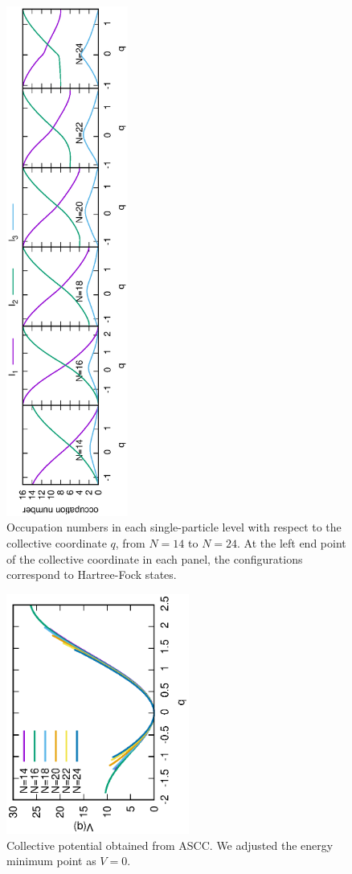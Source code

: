 \documentclass[%
superscriptaddress,
showpacs,
nofootinbib,
amsmath,amssymb,
aps,
prc,
twocolumn,
floatfix ]%
{revtex4-1}
\begin{document}
\begin{figure}[t]
 \begin{center}
  \includegraphics[width=40mm,angle=-90]{occ_number.eps}
 \end{center}
	\caption{Occupation numbers in each single-particle level with respect to the collective coordinate $q$, from $N=14$ to $N=24$. At the left end point of the collective coordinate in each panel, the configurations correspond to Hartree-Fock states.
}
 \label{occ_number}
\end{figure}
\begin{figure}[htbp]
 \begin{center}
  \includegraphics[width=60mm,angle=-90]{potential.eps}
 \end{center}
	\caption{Collective potential obtained from ASCC. We adjusted the energy minimum point as $V=0$.
}
 \label{potential}
\end{figure}
\end{document}

